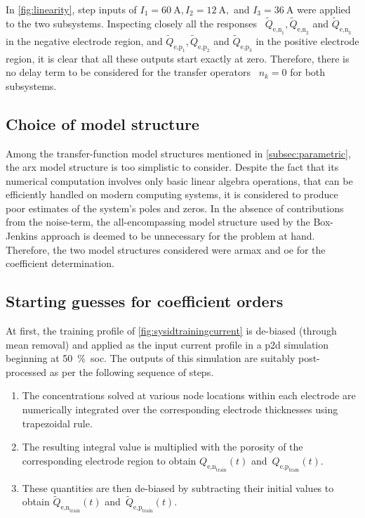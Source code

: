 In \cref{fig:linearity},   step  inputs   of   ${I_1   =  \SI{60}{\ampere},   I_2
=    \SI{12}{\ampere},}$   and    ${I_3   =    \SI{36}{\ampere}}$   were    applied
to    the   two    subsystems.    Inspecting   closely    all   the    responses
\ie~$\widetilde{Q}_{\text{e,n}_1},    \widetilde{Q}_{\text{e,n}_2}   $   and
$\widetilde{Q}_{\text{e,n}_3}$    in    the     negative    electrode    region,
and    $\widetilde{Q}_{\text{e,p}_1},    \widetilde{Q}_{\text{e,p}_2}   $    and
$\widetilde{Q}_{\text{e,p}_3}$  in the  positive electrode  region, it  is clear
that all these outputs start exactly at  zero. Therefore, there is no delay term
to be considered for the transfer operators \ie~${n_k = 0}$ for both subsystems.

\subsection{Choice of model structure}\label{subsec:modelstrucchoice}

Among      the      transfer-function       model      structures      mentioned
in \cref{subsec:parametric}, the \gls{arx} model  structure is too simplistic to
consider. Despite  the fact that  its numerical computation involves  only basic
linear algebra operations,  that can be efficiently handled  on modern computing
systems, it  is considered to produce  poor estimates of the  system's poles and
zeros. In the absence of contributions from the noise-term, the all-encompassing
model structure used by the Box-Jenkins approach is deemed to be unnecessary for
the  problem  at hand.  Therefore,  the  two  model structures  considered  were
\gls{armax} and \gls{oe} for the coefficient determination.

\subsection{Starting guesses for coefficient orders}\label{subsec:initguesscoefforder}

At first, the training profile of \cref{fig:sysidtrainingcurrent} is de-biased
(through mean removal) and applied as the input current profile in a \gls{p2d}
simulation beginning at \SI{50}{\percent}~\gls{soc}. The outputs of this
simulation are suitably post-processed as per the following sequence of steps.
\begin{enumerate}
    \item The concentrations solved at various node locations within each
        electrode are numerically integrated over the corresponding electrode
        thicknesses using trapezoidal rule.
    \item The resulting integral value is multiplied with the porosity of the
        corresponding electrode region to obtain
        $Q_{\text{e,n}_\text{train}}(t)$ and~$Q_{\text{e,p}_\text{train}}(t)$.
    \item These quantities are then de-biased by subtracting their initial
        values to obtain $\widetilde{Q}_{\text{e,n}_\text{train}}(t)$
        and~$\widetilde{Q}_{\text{e,p}_\text{train}}(t)$.
\end{enumerate}

